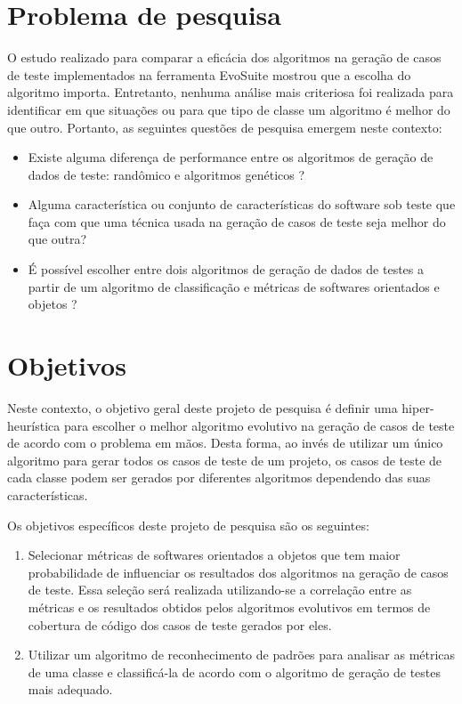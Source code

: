 \documentclass[
	12pt,				%
	oneside,			%
	a4paper,			%
	english,			%
	brazil				%
	]{abntex2ppgsi}
\begin{document}
\section{Problema de pesquisa}

O estudo realizado para comparar a eficácia dos algoritmos na geração de casos de teste implementados na ferramenta EvoSuite mostrou que a escolha do algoritmo importa. Entretanto, nenhuma análise mais criteriosa foi realizada para identificar em que situações ou para que tipo de classe um algoritmo é melhor do que outro. Portanto, as seguintes questões de pesquisa emergem neste contexto:

\begin{itemize}
 \item Existe alguma diferença de performance entre os algoritmos de geração de dados de teste: randômico e algoritmos genéticos ?
 \item Alguma característica ou conjunto de características do software sob teste que faça com que uma técnica usada na geração de casos de teste seja melhor do que outra?
\item É possível escolher entre dois algoritmos de geração de dados de testes a partir de um algoritmo de classificação e métricas de softwares orientados e objetos ?

\end{itemize}

\section{Objetivos}

Neste contexto, o objetivo geral deste projeto de pesquisa  é definir uma hiper-heurística para escolher o melhor algoritmo evolutivo na geração de casos de teste de acordo com o problema em mãos. Desta forma, ao invés de utilizar um único algoritmo para gerar todos os casos de teste de um projeto, os casos de teste de cada classe podem ser gerados por diferentes algoritmos dependendo das suas características.

Os objetivos específicos deste projeto de pesquisa são os seguintes:

\begin{enumerate}
	\item Selecionar métricas de softwares orientados a objetos que tem maior probabilidade de influenciar os resultados dos algoritmos na geração de casos de teste. Essa seleção será realizada utilizando-se a correlação entre as métricas e os resultados obtidos pelos algoritmos evolutivos em termos de cobertura de código dos casos de teste gerados por eles.
	\item Utilizar um algoritmo de reconhecimento de padrões para analisar as métricas  de uma classe e classificá-la de acordo com o algoritmo de geração de testes mais adequado.
\end{enumerate}
\end{document}
